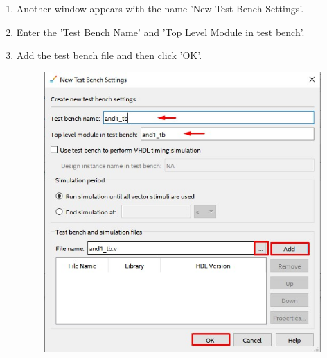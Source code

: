 \documentclass[12pt,singleside,a4paper]{article}
\begin{document}
\begin{enumerate}
\begin{figure}[H]
        \end{figure}
    \item Another window appears with the name 'New Test Bench Settings'.
    \item Enter the 'Test Bench Name' and 'Top Level Module in test bench'.
    \item Add the test bench file and then click 'OK'.
        \begin{figure}[H]
            \centering
            \includegraphics[scale=0.5]{nativelink/nativelinktestbench settings.jpg}
           
        \end{figure}
\end{enumerate}
\end{document}
